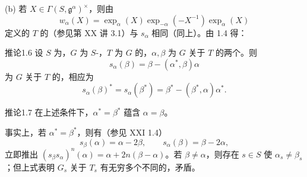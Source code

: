 (b) 若 $X\in\Gamma(S,\mathfrak g^\alpha)^\times$，则由
\[w_\alpha(X)=\exp_\alpha(X)\exp_{-\alpha}(-X^{-1})\exp_\alpha(X)\]
定义的 $T$ 的（参见第 XX 讲 3.1）与 $s_\alpha$ 相同（同上）。由 1.4 得：
\begin{SGAresult}{推论}{1.6}
设 $S$ 为，$G$ 为 $S$-，$T$ 为 $G$ 的，$\alpha,\beta$ 为 $G$ 关于 $T$ 的两个。则
\[s_\alpha(\beta)=\beta-(\alpha^*,\beta)\alpha\]
为 $G$ 关于 $T$ 的，相应为
\[s_\alpha(\beta)^*=s_\alpha(\beta^*)=\beta^*-(\beta^*,\alpha)\alpha^*.\]
\end{SGAresult}
\begin{SGAresult}{推论}{1.7} 在上述条件下，$\alpha^*=\beta^*$ 蕴含 $\alpha=\beta$。\end{SGAresult}
事实上，若 $\alpha^*=\beta^*$，则有（参见 XXI 1.4）
\[s_\beta(\alpha)=\alpha-2\beta,\qquad s_\alpha(\beta)=\beta-2\alpha,\]
立即推出 $(s_\beta s_\alpha)^n(\alpha)=\alpha+2n(\beta-\alpha)$。若 $\beta\ne\alpha$，则存在 $s\in S$ 使 $\alpha_s\ne\beta_s$；但上式表明 $G_s$ 关于 $T_s$ 有无穷多个不同的，矛盾。

